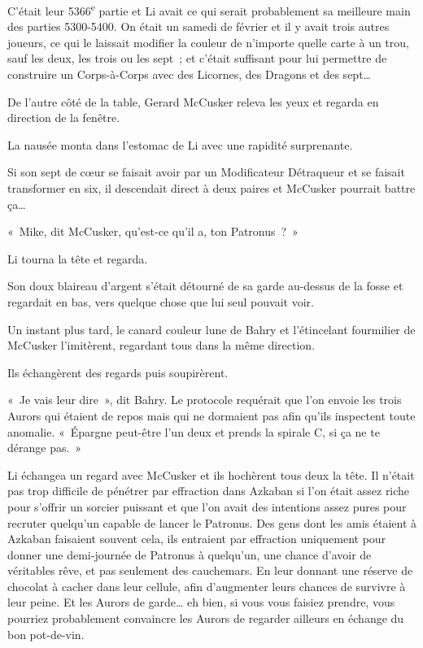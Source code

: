 C'était leur 5366\textsuperscript{e} partie et Li avait ce qui serait probablement sa meilleure main des parties 5300-5400.
On était un samedi de février et il y avait trois autres joueurs, ce qui le laissait modifier la couleur de n'importe quelle carte à un trou, sauf les deux, les trois ou les sept~; et c'était suffisant pour lui permettre de construire un Corps-à-Corps avec des Licornes, des Dragons et des sept…

De l'autre côté de la table, Gerard McCusker releva les yeux et regarda en direction de la fenêtre.

La nausée monta dans l'estomac de Li avec une rapidité surprenante.

Si son sept de cœur se faisait avoir par un Modificateur Détraqueur et se faisait transformer en six, il descendait direct à deux paires et McCusker pourrait battre ça…

«~Mike, dit McCusker, qu'est-ce qu'il a, ton Patronus~?~»

Li tourna la tête et regarda.

Son doux blaireau d'argent s'était détourné de sa garde au-dessus de la fosse et regardait en bas, vers quelque chose que lui seul pouvait voir.

Un instant plus tard, le canard couleur lune de Bahry et l'étincelant fourmilier de McCusker l'imitèrent, regardant tous dans la même direction.

Ils échangèrent des regards puis soupirèrent.

«~Je vais leur dire~», dit Bahry.
Le protocole requérait que l'on envoie les trois Aurors qui étaient de repos mais qui ne dormaient pas afin qu'ils inspectent toute anomalie.
«~Épargne peut-être l'un deux et prends la spirale C, si ça ne te dérange pas.~»

Li échangea un regard avec McCusker et ils hochèrent tous deux la tête.
Il n'était pas trop difficile de pénétrer par effraction dans Azkaban si l'on était assez riche pour s'offrir un sorcier puissant et que l'on avait des intentions assez pures pour recruter quelqu'un capable de lancer le Patronus.
Des gens dont les amis étaient à Azkaban faisaient souvent cela, ils entraient par effraction uniquement pour donner une demi-journée de Patronus à quelqu'un, une chance d'avoir de véritables rêve, et pas seulement des cauchemars.
En leur donnant une réserve de chocolat à cacher dans leur cellule, afin d'augmenter leurs chances de survivre à leur peine.
Et les Aurors de garde… eh bien, si vous vous faisiez prendre, vous pourriez probablement convaincre les Aurors de regarder ailleurs en échange du bon pot-de-vin.

